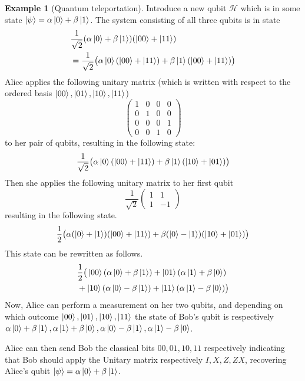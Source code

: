 \documentclass[12pt]{article}
\theoremstyle{plain}
\theoremstyle{definition}
\newtheorem{example}[thm]{Example}
\newcommand{\call}[1]{\mathcal{#1}}
\begin{document}
\begin{example}[Quantum teleportation]
		Introduce a new qubit $\call{H}$ which is in some state $\ket{\psi} = \alpha \ket{0} + \beta\ket{1}$. The system consisting of all three qubits is in state
		\begin{align*}
			&\frac{1}{\sqrt{2}}(\alpha \ket{0} + \beta\ket{1})(\ket{00} + \ket{11})\\
			&= \frac{1}{\sqrt{2}}\big(\alpha\ket{0}(\ket{00} + \ket{11}) + \beta\ket{1}(\ket{00} + \ket{11})\big)
		\end{align*}
		Alice applies the following unitary matrix (which is written with respect to the ordered basis $\ket{00}, \ket{01}, \ket{10}, \ket{11}$)
		\begin{equation}
			\begin{pmatrix}
				1 & 0 & 0 & 0\\
				0 & 1 & 0 & 0\\
				0 & 0 & 0 & 1\\
				0 & 0 & 1 & 0
			\end{pmatrix}
		\end{equation}
		to her pair of qubits, resulting in the following state:
		\begin{equation}
			\frac{1}{\sqrt{2}}\big(\alpha\ket{0}(\ket{00} + \ket{11}) + \beta\ket{1}(\ket{10} + \ket{01})\big)
		\end{equation}
		Then she applies the following unitary matrix to her first qubit
		\begin{equation}
			\frac{1}{\sqrt{2}}
			\begin{pmatrix}
				1 & 1\\
				1 & -1
			\end{pmatrix}
		\end{equation}
		resulting in the following state.
		\begin{equation}
			\frac{1}{2}\big(\alpha(\ket{0} + \ket{1})(\ket{00} + \ket{11}) + \beta(\ket{0} - \ket{1})(\ket{10} + \ket{01})\big)
		\end{equation}
		This state can be rewritten as follows.
		\begin{align*}
			&\frac{1}{2}\big(\ket{00}(\alpha \ket{0} + \beta\ket{1}) + \ket{01}(\alpha\ket{1} + \beta\ket{0})\\
			&+ \ket{10}(\alpha\ket{0} - \beta\ket{1}) + \ket{11}(\alpha\ket{1} - \beta\ket{0})\big)
		\end{align*}
		Now, Alice can perform a measurement on her two qubits, and depending on which outcome $\ket{00}, \ket{01}, \ket{10}, \ket{11}$ the state of Bob's qubit is respectively $\alpha\ket{0} + \beta\ket{1}, \alpha\ket{1} + \beta\ket{0}, \alpha\ket{0} - \beta\ket{1}, \alpha\ket{1} - \beta\ket{0}$.
		
		Alice can then send Bob the classical bits $00, 01, 10, 11$ respectively indicating that Bob should apply the Unitary matrix respectively $I, X, Z, ZX$, recovering Alice's qubit $\ket{\psi} = \alpha\ket{0} + \beta\ket{1}$.
	\end{example}
	
\end{document}
